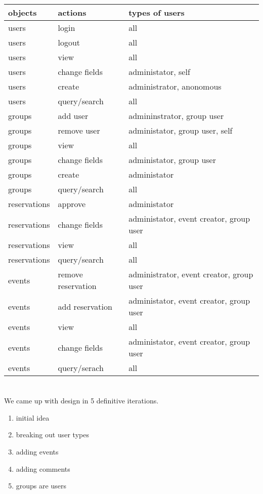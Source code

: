 \documentclass{article}
\begin{document}
\begin{tabular}{lll}
\toprule
 objects & actions & types of users\\
\midrule
 users & login & all \\
users & logout & all \\
users & view & all \\
users & change fields & administator, self \\
users & create & administrator, anonomous \\
users & query/search & all \\
groups & add user & admininstrator, group user\\
groups & remove user & administator, group user, self\\ 
groups & view & all\\
groups & change fields & administator, group user\\
groups & create & administator \\
groups & query/search & all \\
reservations & approve & administator \\
reservations & change fields & administator, event creator, group user \\
reservations & view & all \\
reservations & query/search & all \\
events & remove reservation & administrator, event creator, group user \\
events & add reservation & administator, event creator, group user\\
events & view & all \\
events & change fields & administator, event creator, group user \\
events & query/serach & all \\
\bottomrule
\end{tabular}

\section{}
We came up with design in 5 definitive iterations. 
\begin{enumerate}
\item initial idea
\item breaking out user types
\item adding events
\item adding comments
\item groups are users
\end{enumerate}
\end{document}
